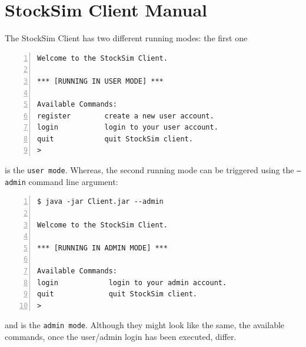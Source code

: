 \chapter{StockSim Client Manual}
The StockSim Client has two different running modes: the first one
\vspace{0.2cm}
\begin{lstlisting}[basicstyle=\footnotesize\ttfamily,language={},numbers=left,keepspaces=true,tabsize=4,
numberstyle=\footnotesize,numbersep=8pt,frame=single]
Welcome to the StockSim Client.

*** [RUNNING IN USER MODE] ***

Available Commands:
register		create a new user account.              
login			login to your user account.             
quit			quit StockSim client. 
> 
\end{lstlisting}
\vspace{-0.5cm}
is the \texttt{user mode}. Whereas, the second running mode can be triggered 
using the \texttt{--admin} command line argument:
\vspace{0.2cm}
\begin{lstlisting}[basicstyle=\footnotesize\ttfamily,language={},numbers=left,keepspaces=true,tabsize=4,
numberstyle=\footnotesize,numbersep=8pt,frame=single]
$ java -jar Client.jar --admin

Welcome to the StockSim Client.

*** [RUNNING IN ADMIN MODE] ***

Available Commands:
login            login to your admin account.            
quit             quit StockSim client.                   
> 
\end{lstlisting}
\vspace{-0.5cm}
and is the \texttt{admin mode}. Although they might look like the same, the 
available commands, once the user/admin login has been executed, differ.
